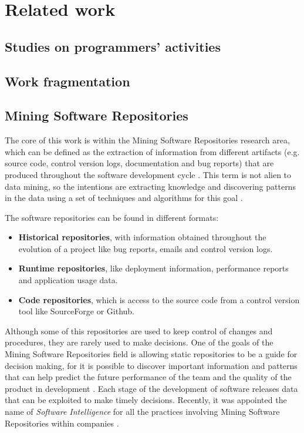 \chapter{Related work}

\section{Studies on programmers' activities}

\section{Work fragmentation}


\section{Mining Software Repositories}
The core of this work is within the Mining Software Repositories research area, which can be defined as the extraction of information from different artifacts (e.g. source code, control version logs, documentation and bug reports) that are produced throughout the software development cycle \cite{e}. This term is not alien to data mining, so the intentions are extracting knowledge and discovering patterns in the data using a set of techniques and algorithms for this goal \cite{e}.

The software repositories can be found in different formats:
\begin{itemize}
	\item \textbf{Historical repositories}, with information obtained throughout the evolution of a project like bug reports, emails and control version logs.
	\item \textbf{Runtime repositories}, like deployment information, performance reports and application usage data.
	\item \textbf{Code repositories}, which is access to the source code from a control version tool like SourceForge or Github.
\end{itemize}

Although some of this repositories are used to keep control of changes and procedures, they are rarely used to make decisions. One of the goals of the Mining Software Repositories field is allowing static repositories to be a guide for decision making, for it is possible to discover important information and patterns that can help predict the future performance of the team and the quality of the product in development \cite{e}. Each stage of the development of software releases data that can be exploited to make timely decisions. Recently, it was appointed the name of \emph{Software Intelligence} for all the practices involving Mining Software Repositories within companies \cite{e}.

